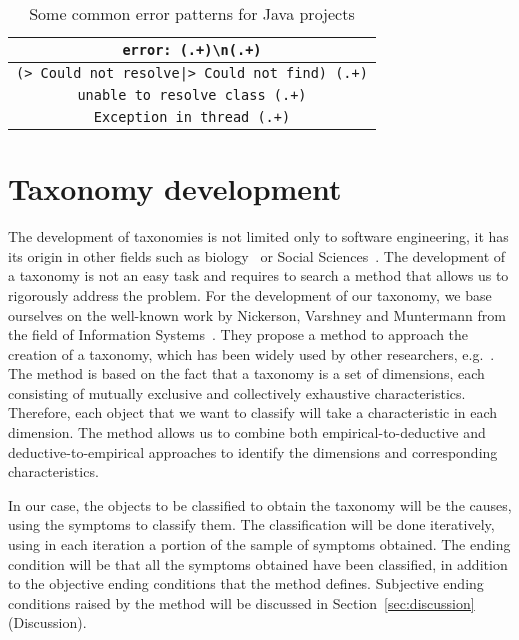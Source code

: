\begin{table}
	\caption{Some common error patterns for Java projects}
	\label{table:commmonErrors}
	\begin{center}
		\begin{tabular}{c}
			\toprule
			\verb|error: (.+)\n(.+)| \\
			\midrule
			\verb=(> Could not resolve|> Could not find) (.+)= \\
			\midrule
			\verb|unable to resolve class (.+)| \\
			\midrule
			\verb|Exception in thread (.+)| \\
			\bottomrule
		\end{tabular}
	\end{center}
\end{table}

\section{Taxonomy development}\label{subsec:taxonomy}

The development of taxonomies is not limited only to software engineering, it has its origin in other fields such as biology~\cite{eldredge1980phylogenetic,sneath1973numerical} or Social Sciences~\cite{bailey1994typologies}.
The development of a taxonomy is not an easy task and requires to search a method that allows us to rigorously address the problem.
For the development of our taxonomy, we base ourselves on the well-known work by Nickerson, Varshney and Muntermann from the field of Information Systems~\cite{Nickerson2013}.
They propose a method to approach the creation of a taxonomy, which has been widely used by other researchers, e.g.~\cite{Krug2012APT,Geiger2011ManagingTC}.
The method is based on the fact that a taxonomy is a set of dimensions, each consisting of mutually exclusive and collectively exhaustive characteristics.
Therefore, each object that we want to classify will take a characteristic in each dimension.
The method allows us to combine both empirical-to-deductive and deductive-to-empirical approaches to identify the dimensions and corresponding characteristics.

In our case, the objects to be classified to obtain the taxonomy will be the causes, using the symptoms to classify them.
The classification will be done iteratively, using in each iteration a portion of the sample of symptoms obtained.
The ending condition will be that all the symptoms obtained have been classified, in addition to the objective ending conditions that the method defines.
Subjective ending conditions raised by the method will be discussed in Section~\ref{sec:discussion} (Discussion).




